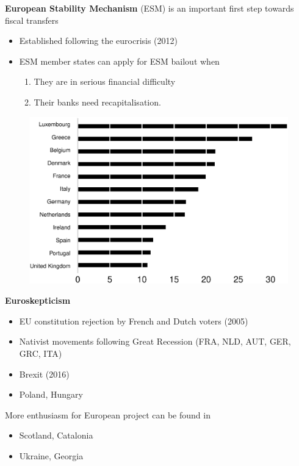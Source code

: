 \documentclass{beamer}
\begin{document}
\begin{frame}
 \textbf{European Stability Mechanism} (ESM) is an important first step towards fiscal transfers
   \begin{itemize}
    \item Established following the eurocrisis (2012)
    \item ESM member states can apply for ESM bailout when 
    \begin{enumerate}
      \item They are in serious financial difficulty
      \item Their banks need recapitalisation. 
    \end{enumerate}
  \end{itemize}       
\end{frame}


\begin{frame}
  \begin{figure}
    \includegraphics[scale=.4]{eurobarometer.eps}
  \end{figure}
\end{frame}

\begin{frame}
  \textbf{Euroskepticism}
  \begin{itemize}
    \item EU constitution rejection by French and Dutch voters (2005)
    \item Nativist movements following Great Recession (FRA, NLD, AUT, GER, GRC, ITA) 
    \item Brexit (2016)
    \item Poland, Hungary
  \end{itemize}
  \medskip
  More enthusiasm for European project can be found in   
  \begin{itemize}
    \item Scotland, Catalonia
    \item Ukraine, Georgia
  \end{itemize}
\end{frame}
\end{document}

